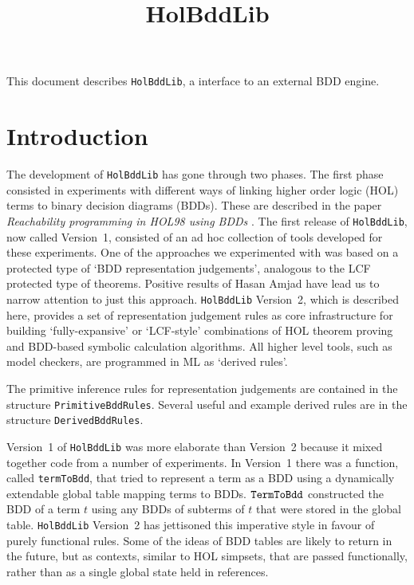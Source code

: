 \documentclass[12pt,fleqn]{article}
\title{HolBddLib}
\date{}
\renewcommand{\t}[1]{\mbox{\tt #1}}
\begin{document}
\maketitle
{}

This document describes {\tt HolBddLib}, a \HOL{} interface to an external BDD engine.

\section{Introduction}

The development of {\tt HolBddLib} has gone through two phases.  The
first phase consisted in experiments with different ways of linking
higher order logic (HOL) terms to binary decision diagrams (BDDs).
These are described in the paper {\it Reachability programming in HOL98 using BDDs\/} \cite{tphols2000-Gordon}. The first release of
\t{HolBddLib}, now called Version~1, consisted of an ad hoc collection
of tools developed for these experiments.  One of the approaches we
experimented with was based on a protected type of `BDD representation
judgements', analogous to the LCF protected type of theorems.
Positive results of Hasan Amjad \cite{Amjad:TPHOLs2001} have lead us
to narrow attention to just this approach. \t{HolBddLib} Version~2,
which is described here, provides a set of representation judgement
rules as core infrastructure for building `fully-expansive' or
`LCF-style' combinations of HOL theorem proving and BDD-based symbolic
calculation algorithms. All higher level tools, such as model
checkers, are programmed in ML as `derived rules'.

The primitive inference rules for representation judgements are contained in the structure
{\tt{PrimitiveBddRules}}. Several useful and example  derived rules are in the
structure {\tt{DerivedBddRules}}. 

Version~1 of {\tt{HolBddLib}} was more elaborate than Version~2
because it mixed together code from a number of experiments.
In Version~1 there was a function, called
{\texttt{termToBdd}}, that tried to represent a \HOL{} term as a BDD
using a dynamically extendable global table mapping \HOL{} terms to
BDDs.  $\t{TermToBdd}$ constructed the BDD of a term $t$ using any
BDDs of subterms of $t$ that were stored in the global table.
{\tt{HolBddLib}} Version~2 has jettisoned this imperative style
in favour of purely functional rules. Some of
the ideas of BDD tables are likely to return in the future, but as
contexts, similar to HOL simpsets, that are passed functionally,
rather than as a single global state held in references.
\end{document}
